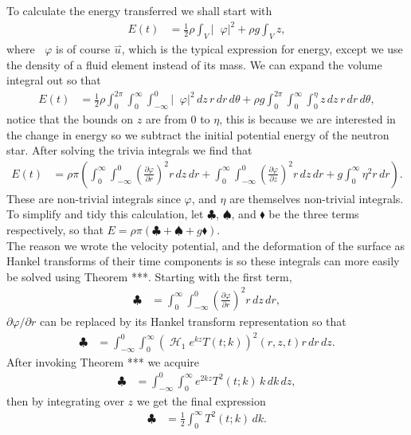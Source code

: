 \documentclass[12pt]{article}
\DeclareMathOperator{\grad}{\overset{\rightharpoonup}\nabla}
\DeclareMathOperator{\Hsign}{\mathscr{H}}
\newcommand\Hank[2][]{{\left( \Hsign_{#1} #2 \right) }}
\begin{document}
To calculate the energy transferred we shall start with
\begin{align*}
E(t) &= \frac{1}{2} \rho \int_V \left| \grad \varphi \right|^2 + \rho g \int_V z,
\end{align*}
where $\grad \varphi$ is of course $\overset{\rightharpoonup}u$, which is the typical expression for energy, except we use the density of a fluid element instead of its mass. We can expand the volume integral out so that 
\begin{align*}
E(t) &= \frac{1}{2} \rho \int_0^{2\pi} \int_0^\infty \int_{-\infty}^0 \left| \grad \varphi \right|^2 \, dz \, r \, dr \, d\theta + \rho g \int_0^{2\pi} \int_0^\infty \int_0^\eta z \, dz \, r \, dr \, d\theta,
\end{align*}
notice that the bounds on $z$ are from $0$ to $\eta$, this is because we are interested in the change in energy so we subtract the initial potential energy of the neutron star. After solving the trivia integrals we find that
\begin{align*}
E(t) &= \rho \pi \left( \int_0^\infty \int_{-\infty}^0 \left( \frac{\partial \varphi}{\partial r} \right)^2 r \, dz \, dr + \int_0^\infty \int_{-\infty}^0 \left( \frac{\partial \varphi}{\partial z} \right)^2 r \, dz \, dr + g \int_0^\infty \eta^2 r \, dr \right).
\end{align*}
These are non-trivial integrals since $\varphi$, and $\eta$ are themselves non-trivial integrals. To simplify and tidy this calculation, let $\clubsuit$, $\spadesuit$, and $\blacklozenge$ be the three terms respectively, so that $E = \rho \pi (\clubsuit + \spadesuit + g \blacklozenge)$. \\

The reason we wrote the velocity potential, and the deformation of the surface as Hankel transforms of their time components is so these integrals can more easily be solved using Theorem ***. Starting with the first term,
\begin{align*}
\clubsuit &= \int_0^\infty \int_{-\infty}^0 \left( \frac{\partial \varphi}{\partial r} \right)^2 r \, dz \, dr,
\end{align*}
$\partial \varphi / \partial r$ can be replaced by its Hankel transform representation so that
\begin{align*}
\clubsuit &= \int_{-\infty}^0 \int_0^\infty \Hank[1]{e^{kz}T(t;k)}^2(r,z,t) r \, dr \, dz.
\end{align*}
After invoking Theorem *** we acquire
\begin{align*}
\clubsuit &= \int_{-\infty}^0 \int_0^\infty e^{2kz} T^2(t;k) \, k \, dk \, dz,
\end{align*}
then by integrating over $z$ we get the final expression
\begin{align*}
\clubsuit &= \frac{1}{2} \int_0^\infty T^2(t;k) \, dk.
\end{align*}
\end{document}
